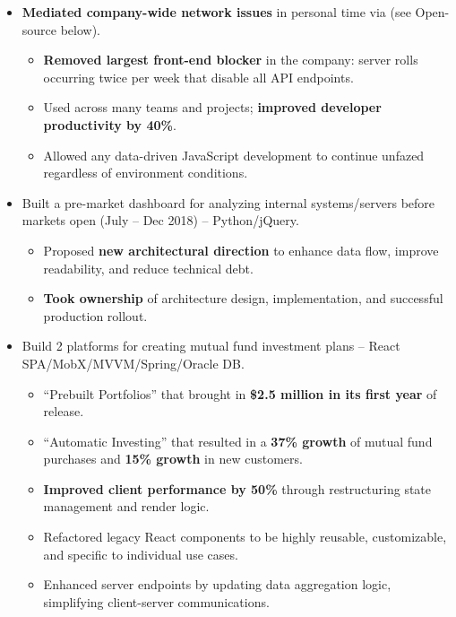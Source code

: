 \documentclass[10pt, letterpaper]{article}
\let\oldunderline\underline
\renewcommand{\underline}[1]{\oldunderline{\smash{#1}}}
\newcommand{\ul}[1]{%
    \begin{itemize}%
    #1%
    \end{itemize}%
}
\newcommand{\q}[1]{``#1''}
\newcommand{\nonsecref}[1]{\hyperref[#1]{\underline{#1}}}
\begin{document}
\ul{
    \item \textbf{Mediated company-wide network issues} in personal time via \nonsecref{MockRequests} (see Open-source below).

    \ul{
        \item \textbf{Removed largest front-end blocker} in the company: server rolls occurring twice per week that disable all API endpoints.

        \item Used across many teams and projects; \textbf{improved developer productivity by 40\%}.

        \item Allowed any data-driven JavaScript development to continue unfazed regardless of environment conditions.
    }

    \item Built a pre-market dashboard for analyzing internal systems/servers before markets open (July -- Dec 2018) -- Python/jQuery.

    \ul{
        \item Proposed \textbf{new architectural direction} to enhance data flow, improve readability, and reduce technical debt.

        \item \textbf{Took ownership} of architecture design, implementation, and successful production rollout.
    }

    \item Build 2 platforms for creating mutual fund investment plans -- React SPA/MobX/MVVM/Spring/Oracle DB.

    \ul{
        \item \q{Prebuilt Portfolios} that brought in \textbf{\$2.5 million in its first year} of release.

        \item \q{Automatic Investing} that resulted in a \textbf{37\% growth} of mutual fund purchases and \textbf{15\% growth} in new customers.

        \item \textbf{Improved client performance by 50\%} through restructuring state management and render logic.

        \item Refactored legacy React components to be highly reusable, customizable, and specific to individual use cases.

        \item Enhanced server endpoints by updating data aggregation logic, simplifying client-server communications.
    }

}
\end{document}
